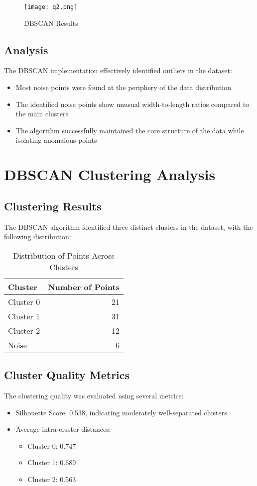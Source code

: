 \documentclass[12pt]{article}
\begin{document}
\begin{figure}[H]
    \centering
    \texttt{[image: q2.png]}
    \caption{DBSCAN Results}
    \label{fig:enter-label}
\end{figure}
\subsection{Analysis}
The DBSCAN implementation effectively identified outliers in the dataset:
\begin{itemize}
    \item Most noise points were found at the periphery of the data distribution
    \item The identified noise points show unusual width-to-length ratios compared to the main clusters
    \item The algorithm successfully maintained the core structure of the data while isolating anomalous points
\end{itemize}
\section{DBSCAN Clustering Analysis}

\subsection{Clustering Results}
The DBSCAN algorithm identified three distinct clusters in the dataset, with the following distribution:

\begin{table}[H]
\centering
\begin{tabular}{lr}
\toprule
Cluster & Number of Points \\
\midrule
Cluster 0 & 21 \\
Cluster 1 & 31 \\
Cluster 2 & 12 \\
Noise & 6 \\
\bottomrule
\end{tabular}
\caption{Distribution of Points Across Clusters}
\end{table}

\subsection{Cluster Quality Metrics}
The clustering quality was evaluated using several metrics:
\begin{itemize}
    \item Silhouette Score: 0.538, indicating moderately well-separated clusters
    \item Average intra-cluster distances:
    \begin{itemize}
        \item Cluster 0: 0.747
        \item Cluster 1: 0.689
        \item Cluster 2: 0.563
    \end{itemize}
\end{itemize}
\end{document}
